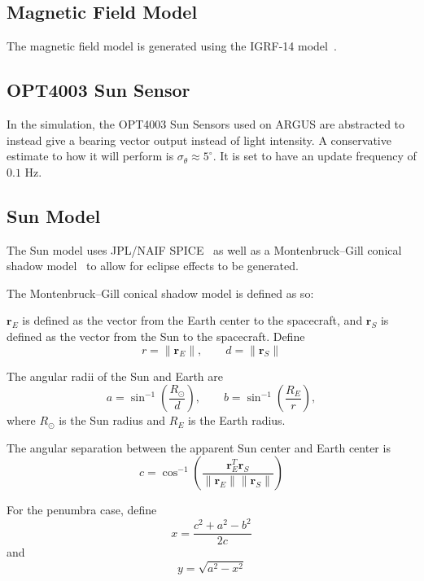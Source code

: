 \documentclass[conference,onecolumn,draftclsnofoot]{IEEEtran}
\begin{document}
\subsection{Magnetic Field Model}

The magnetic field model is generated using the IGRF-14 model~\cite{iaga2024igrf14}.


\subsection{OPT4003 Sun Sensor}

In the simulation, the OPT4003 Sun Sensors used on ARGUS are abstracted to instead give a bearing vector output instead of light intensity. A conservative estimate to how it will perform is $\sigma_{\theta} \approx 5^{\circ}$. It is set to have an update frequency of $0.1$ Hz.


\subsection{Sun Model}\label{sec:sun-model}

The Sun model uses JPL/NAIF SPICE~\cite{naifSpiceToolkit} as well as a Montenbruck--Gill conical shadow model~\cite{montenbruck2000satelliteOrbits} to allow for eclipse effects to be generated.

The Montenbruck--Gill conical shadow model is defined as so:

\(\mathbf r_E\) is defined as the vector from the Earth center to the spacecraft, and
\(\mathbf r_S\) is defined as the vector from the Sun to the spacecraft. Define
\begin{equation}
r = \|\mathbf r_E\|,
\qquad
d = \|\mathbf r_S\|
\end{equation}

The angular radii of the Sun and Earth are
\begin{equation}
a =
\sin^{-1}
\left(
\frac{R_{\odot}}{d}
\right),
\qquad
b =
\sin^{-1}
\left(
\frac{R_E}{r}
\right),
\end{equation}
where \(R_{\odot}\) is the Sun radius and \(R_E\) is the Earth radius.

The angular separation between the apparent Sun center and Earth center is
\begin{equation}
c =
\cos^{-1}
\left(
\frac{\mathbf r_E^T\mathbf r_S}
{\|\mathbf r_E\|\|\mathbf r_S\|}
\right)
\end{equation}

For the penumbra case, define
\begin{equation}
x =
\frac{c^2+a^2-b^2}{2c}
\end{equation}
and
\begin{equation}
y =
\sqrt{a^2-x^2}
\end{equation}
\end{document}
